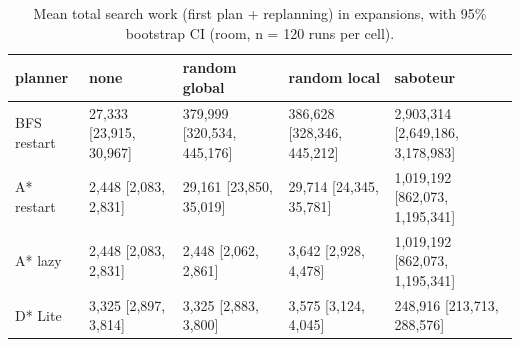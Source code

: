 \begin{table}[t]
\centering
\small
\caption{Mean total search work (first plan + replanning) in expansions, with 95\% bootstrap CI (room, n = 120 runs per cell).}
\label{tab:total-room}
\begin{tabular}{lllll}
\toprule
planner & none & random global & random local & saboteur \\
\midrule
BFS restart & 27,333 [23,915, 30,967] & 379,999 [320,534, 445,176] & 386,628 [328,346, 445,212] & 2,903,314 [2,649,186, 3,178,983] \\
A* restart & 2,448 [2,083, 2,831] & 29,161 [23,850, 35,019] & 29,714 [24,345, 35,781] & 1,019,192 [862,073, 1,195,341] \\
A* lazy & 2,448 [2,083, 2,831] & 2,448 [2,062, 2,861] & 3,642 [2,928, 4,478] & 1,019,192 [862,073, 1,195,341] \\
D* Lite & 3,325 [2,897, 3,814] & 3,325 [2,883, 3,800] & 3,575 [3,124, 4,045] & 248,916 [213,713, 288,576] \\
\bottomrule
\end{tabular}
\end{table}
